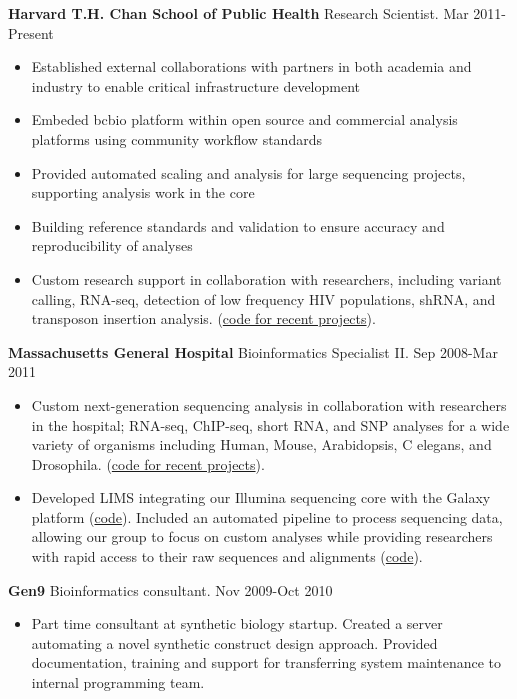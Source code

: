 \documentclass[10pt]{article}
\renewcommand{\section}[2]%
        {\pagebreak[2]\vspace{1.3\baselineskip}%
         \phantomsection\addcontentsline{toc}{section}{#1}%
         \hspace{0in}%
         \marginpar{
         \raggedright \scshape #1}#2}
\begin{document}
\section{Experience}
%
\textbf{Harvard T.H. Chan School of Public Health} Research Scientist. Mar 2011-Present
\begin{itemize}
  \item Established external collaborations with partners in both
    academia and industry to enable critical infrastructure development
  \item Embeded bcbio platform within open source and commercial
    analysis platforms using community workflow standards
  \item Provided automated scaling and analysis for large sequencing
    projects, supporting analysis work in the core
  \item Building reference standards and validation to ensure accuracy and
    reproducibility of analyses
  \item Custom research support in collaboration with researchers,
    including variant calling, RNA-seq, detection of low frequency HIV
    populations, shRNA, and transposon insertion analysis.
    (\href{https://github.com/hbc/projects}{code for recent projects}).
\end{itemize}

\textbf{Massachusetts General Hospital} Bioinformatics Specialist II. Sep 2008-Mar 2011
\begin{itemize}
  \item Custom next-generation sequencing analysis in collaboration with
    researchers in the hospital; RNA-seq, ChIP-seq, short RNA, and SNP 
    analyses for a wide variety of organisms including Human, Mouse, Arabidopsis,
    C elegans, and Drosophila.
    (\href{https://github.com/chapmanb/mgh_projects}{code for recent projects}).
  \item Developed LIMS integrating our Illumina sequencing core with 
    the Galaxy platform (\href{https://bitbucket.org/chapmanb/galaxy-central}{code}).
    Included an automated pipeline to process sequencing data, allowing our 
    group to focus on custom analyses while providing researchers with rapid
    access to their raw sequences and alignments
    (\href{https://github.com/chapmanb/bcbb/tree/master/nextgen}{code}).
\end{itemize}

\textbf{Gen9} Bioinformatics consultant. Nov 2009-Oct 2010
\begin{itemize}
  \item[] Part time consultant at synthetic biology startup. Created a server
    automating a novel synthetic construct design approach.
    Provided documentation, training and support for transferring system
    maintenance to internal programming team.
\end{itemize}
\end{document}
